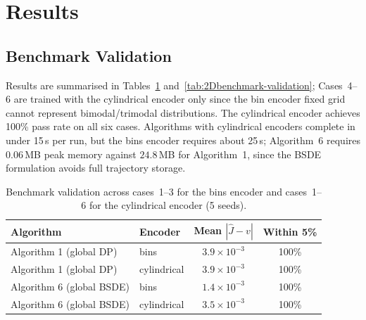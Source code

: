 \documentclass[11pt]{article}
\begin{document}
\section{Results}\label{sec:results}

\subsection{Benchmark Validation}
Results are summarised in Tables~\ref{tab:benchmark-validation} and~\ref{tab:2Dbenchmark-validation}; Cases~4--6 are trained with the cylindrical encoder only since the bin encoder fixed grid cannot represent bimodal/trimodal distributions. The cylindrical encoder achieves 100\% pass rate on all six cases. Algorithms with cylindrical encoders complete in under 15\,s per run, but the bins encoder requires about 25\,s; Algorithm~6 requires $0.06$\,MB peak memory against $24.8$\,MB for Algorithm~1, since the BSDE formulation avoids full trajectory storage.

\begin{table}[H]
  \centering
  \begin{tabular}{llcc}
    \toprule
    Algorithm & Encoder & Mean $|\hat J - v|$ & Within 5\% \\
    \midrule
    Algorithm 1 (global DP)   & bins         & $3.9 \times 10^{-3}$ & 100\% \\
    Algorithm 1 (global DP)   & cylindrical  & $3.9 \times 10^{-3}$ & 100\% \\
    Algorithm 6 (global BSDE) & bins         & $1.4 \times 10^{-3}$ & 100\% \\
    Algorithm 6 (global BSDE) & cylindrical  & $3.5 \times 10^{-3}$ & 100\% \\
    \bottomrule
  \end{tabular}
  \caption{Benchmark validation across cases~1--3 for the bins encoder and cases~1--6 for the cylindrical encoder (5 seeds).}
  \label{tab:benchmark-validation}
\end{table}
\end{document}
